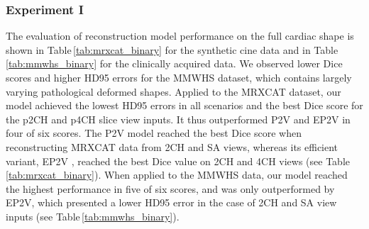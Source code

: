         \subsubsection{Experiment I}
            The evaluation of reconstruction model performance on the full cardiac shape is shown in Table\,\ref{tab:mrxcat_binary} for the synthetic cine data and in Table\,\ref{tab:mmwhs_binary} for the clinically acquired data. We observed lower Dice scores and higher HD95 errors for the MMWHS dataset, which contains largely varying pathological deformed shapes.
            Applied to the MRXCAT dataset, our model achieved the lowest HD95 errors in all scenarios and the best Dice score for the p2CH and p4CH slice view inputs. It thus outperformed P2V and EP2V in four of six scores.
            The P2V model \cite{xie2019pix2vox} reached the best Dice score when reconstructing MRXCAT data from 2CH and SA views, whereas its efficient variant, EP2V \cite{stojanovski2022efficient}, reached the best Dice value on 2CH and 4CH views (see Table\,\ref{tab:mrxcat_binary}).
            When applied to the MMWHS data, our model reached the highest performance in five of six scores,
            and was only outperformed by EP2V, which presented a lower HD95 error in the case of 2CH and SA view inputs (see Table\,\ref{tab:mmwhs_binary}).

